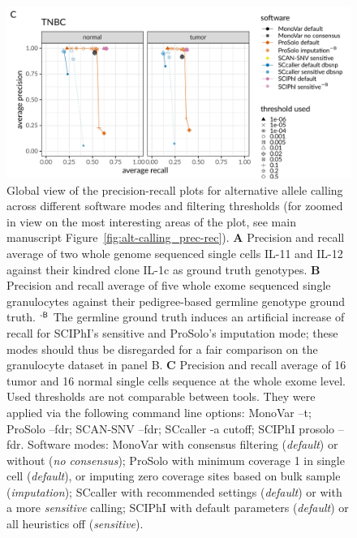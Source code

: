 \documentclass[authoryear,preprint,11pt]{scrartcl}
\begin{document}
\begin{figure}[!tpb]
\begin{minipage}{.9\linewidth}
  \includegraphics[height=42ex]{figs/Wang2014/Wang2014_prosolo-monovar-scansnv-sccaller-scvilp_precision-recall-plot.pdf} \newline
 \end{minipage}
 \caption{
  Global view of the precision-recall plots for alternative allele calling across different software modes and filtering thresholds (for zoomed in view on the most interesting areas of the plot, see main manuscript Figure~\ref{fig:alt-calling_prec-rec}).
  \textbf{A} Precision and recall average of two whole genome sequenced single cells IL-11 and IL-12 against their kindred clone IL-1c as ground truth genotypes.
  \textbf{B} Precision and recall average of five whole exome sequenced single granulocytes against their pedigree-based germline genotype ground truth.\newline 
  $^\text{\sffamily-B}$ The germline ground truth induces an artificial increase of recall for SCIPhI's sensitive and ProSolo's imputation mode; these modes should thus be disregarded for a fair comparison on the granulocyte dataset in panel B.\newline
  \textbf{C} Precision and recall average of 16 tumor and 16 normal single cells sequence at the whole exome level. \newline \footnotesize
  Used thresholds are not comparable between tools.
  They were applied via the following command line options:
  MonoVar {\ttfamily --t};
  ProSolo {\ttfamily --fdr};
  SCAN-SNV {\ttfamily --fdr};
  SCcaller {\ttfamily -a cutoff};
  SCIPhI {\ttfamily prosolo --fdr}.
  Software modes:
  MonoVar with consensus filtering ({\itshape default}) or without ({\itshape no consensus});
  ProSolo with minimum coverage 1 in single cell ({\itshape default}), or imputing zero coverage sites based on bulk sample ({\itshape imputation});
  SCcaller with recommended settings ({\itshape default}) or with a more {\itshape sensitive} calling;
  SCIPhI with default parameters ({\itshape default}) or all heuristics off ({\itshape sensitive}).
  }
 \label{fig:alt-calling_prec-rec_global}
\end{figure}
\end{document}
